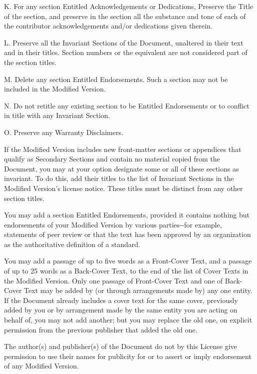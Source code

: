 \begin{noIndex}
K. For any section Entitled
{\textquotedbl}Acknowledgements{\textquotedbl} or
{\textquotedbl}Dedications{\textquotedbl}, Preserve the Title of the
section, and preserve in the section all the substance and tone of
each of the contributor acknowledgements and/or dedications given
therein.

L. Preserve all the Invariant Sections of the Document, unaltered in
their text and in their titles. Section numbers or the equivalent are
not considered part of the section titles.

M. Delete any section Entitled
{\textquotedbl}Endorsements{\textquotedbl}. Such a section may not be
included in the Modified Version.

N. Do not retitle any existing section to be Entitled
{\textquotedbl}Endorsements{\textquotedbl} or to conflict in title
with any Invariant Section.

O. Preserve any Warranty Disclaimers.

If the Modified Version includes new front-matter sections or
appendices that qualify as Secondary Sections and contain no material
copied from the Document, you may at your option designate some or all
of these sections as invariant. To do this, add their titles to the
list of Invariant Sections in the Modified Version's license
notice. These titles must be distinct from any other section titles.

You may add a section Entitled
{\textquotedbl}Endorsements{\textquotedbl}, provided it contains
nothing but endorsements of your Modified Version by various
parties-{}-for example, statements of peer review or that the text has
been approved by an organization as the authoritative definition of a
standard.

You may add a passage of up to five words as a Front-Cover Text, and a
passage of up to 25 words as a Back-Cover Text, to the end of the list
of Cover Texts in the Modified Version. Only one passage of
Front-Cover Text and one of Back-Cover Text may be added by (or
through arrangements made by) any one entity. If the Document already
includes a cover text for the same cover, previously added by you or
by arrangement made by the same entity you are acting on behalf of,
you may not add another; but you may replace the old one, on explicit
permission from the previous publisher that added the old one.

The author(s) and publisher(s) of the Document do not by this License
give permission to use their names for publicity for or to assert or
imply endorsement of any Modified Version.



\end{noIndex}
